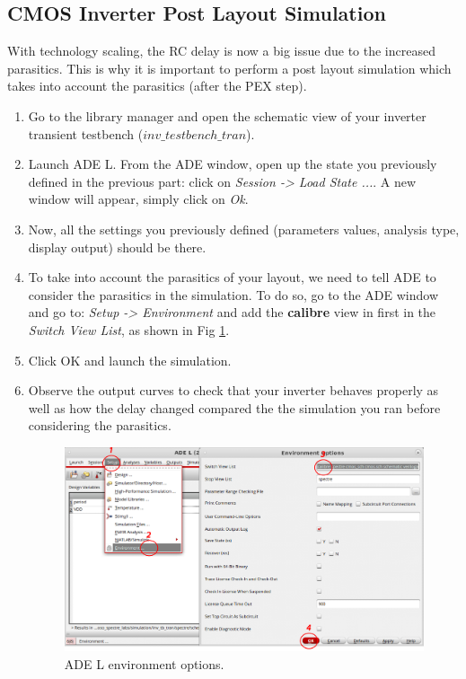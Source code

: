 \subsection{CMOS Inverter Post Layout Simulation}
With technology scaling, the RC delay is now a big issue due to the increased parasitics. This is why it is important to perform a post layout simulation which takes into account the parasitics (after the PEX step). 
\begin{enumerate}
	\item Go to the library manager and open the schematic view of your inverter transient testbench ($inv\_testbench\_tran$).
	\item Launch ADE L. From the ADE window, open up the state you previously defined in the previous part: click on \textit{Session -> Load State ...}. A new window will appear, simply click on \textit{Ok}.
	\item Now, all the settings you previously defined (parameters values, analysis type, display output) should be there.
	\item To take into account the parasitics of your layout, we need to tell ADE to consider the parasitics in the simulation. To do so, go to the ADE window and go to: \textit{Setup -> Environment} and add the \textbf{calibre} view in first in the \textit{Switch View List}, as shown in Fig \ref{fig_simpex}.
	\item Click OK and launch the simulation. 
	\item Observe the output curves to check that your inverter behaves properly as well as how the delay changed compared the the simulation you ran before considering the parasitics.
	\begin{figure}[!h]
		\centering
		\includegraphics[scale=0.45]{figures/lab2_layout/ade_pex}
		\caption{ADE L environment options.}
		\label{fig_simpex}
	\end{figure}
	
\end{enumerate}

